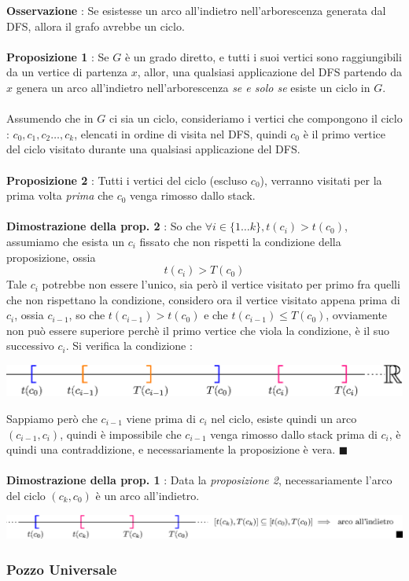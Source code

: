 \documentclass[12pt, letterpaper]{article}
\newcommand{\acc}{\\\hphantom{}\\}
\begin{document}
\textbf{Osservazione} : Se esistesse un arco all'indietro nell'arborescenza generata dal DFS, allora
il grafo avrebbe un ciclo.\acc
\textbf{Proposizione 1} : Se \(G\) è un grado diretto, e tutti i suoi vertici sono raggiungibili da un
vertice di partenza \(x\), allor, una qualsiasi applicazione del DFS partendo da \(x\) genera un
arco all'indietro nell'arborescenza \textit{se e solo se} esiste un ciclo in \(G\).\acc
Assumendo che in \(G\) ci sia un ciclo, consideriamo i vertici che compongono il ciclo :
$c_0,c_1,c_2\dots,c_k$, elencati in ordine di visita nel DFS, quindi \(c_0\) è il primo vertice del ciclo
visitato durante una qualsiasi applicazione del DFS.
\acc\textbf{Proposizione 2} : Tutti i vertici del ciclo (escluso $c_0$), verranno visitati per la prima
volta \textit{prima} che \(c_0\) venga rimosso dallo stack.\acc
\textbf{Dimostrazione della prop. 2} : So che $\forall i\in\{1\dots k\},t(c_i)>t(c_0)$, assumiamo che
esista un \(c_i\) fissato che non rispetti la condizione della proposizione, ossia $$t(c_i)>T(c_0)$$
Tale $c_i$ potrebbe non essere l'unico, sia però il vertice visitato per primo fra quelli che non rispettano
la condizione, considero ora il vertice visitato appena prima di $c_i$, ossia $c_{i-1}$, so che
$t(c_{i-1})>t(c_0)$ e che $t(c_{i-1})\le T(c_0)$, ovviamente non può essere superiore perchè il primo
vertice che viola la condizione, è il suo successivo $c_i$. Si verifica la condizione :
\begin{center}
    \includegraphics[width=1\textwidth ]{images/realLine.eps}
\end{center}
Sappiamo però che $c_{i-1}$ viene prima di $c_i$ nel ciclo, esiste quindi un arco $(c_{i-1},c_i)$, quindi
è impossibile che $c_{i-1}$ venga rimosso dallo stack prima di $c_i$, è quindi una contraddizione, e
necessariamente la proposizione è vera. \(\blacksquare\)\acc
\textbf{Dimostrazione della prop. 1} : Data la \textit{proposizione 2}, necessariamente l'arco del
ciclo \((c_k,c_0)\) è un arco all'indietro. \begin{center}
    \includegraphics[width=1\textwidth ]{images/realLine2.eps}
\end{center}\subsubsection{Pozzo Universale}
\end{document}
